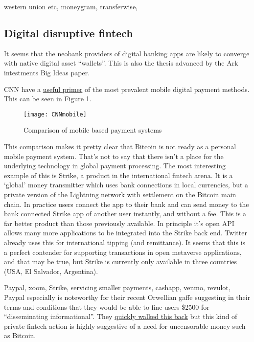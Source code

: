 western union etc, moneygram, transferwise,
\subsection{Digital disruptive fintech}
It seems that the neobank providers of digital banking apps are likely to converge with native digital asset ``wallets''. This is also the thesis advanced by the Ark intestments Big Ideas paper.\par
CNN have a \href{https://money.cnn.com/infographic/technology/mobile-payment-comparison/index.html}{useful primer} of the most prevalent mobile digital payment methods. This can be seen in Figure \ref{fig:CNNmobile}.
\begin{figure}
  \centering
    \texttt{[image: CNNmobile]}
  \caption{Comparison of mobile based payment systems}
  \label{fig:CNNmobile}
\end{figure}
This comparison makes it pretty clear that Bitcoin is not ready as a personal mobile payment system. That's not to say that there isn't a place for the underlying technology in global payment processing. 
The most interesting example of this is Strike, a product in the international fintech arena. It is a `global' money transmitter which uses bank connections in local currencies, but a private version of the Lightning network with settlement on the Bitcoin main chain. In practice users connect the app to their bank and can send money to the bank connected Strike app of another user instantly, and without a fee. This is a far better product than those previously available. In principle it's open API allows many more applications to be integrated into the Strike back end. Twitter already uses this for international tipping (and remittance). It seems that this is a perfect contender for supporting transactions in open metaverse applications, and that may be true, but Strike is currently only available in three countries (USA, El Salvador, Argentina).\par
Paypal, xoom, Strike, servicing smaller payments, cashapp, venmo, revulot, 
Paypal especially is noteworthy for their recent Orwellian gaffe suggesting in their terms and conditions that they would be able to fine users \$2500 for ``disseminating informational''. They \href{https://www.yahoo.com/video/paypal-policy-permits-company-fine-143946902.html}{quickly walked this back} but this kind of private fintech action is highly suggestive of a need for uncensorable money such as Bitcoin.
